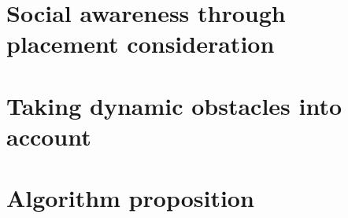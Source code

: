 

\section{Social awareness through placement consideration}



\section{Taking dynamic obstacles into account}



\section{Algorithm proposition}

%

%
